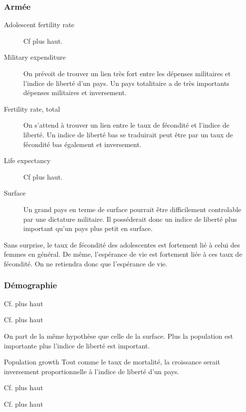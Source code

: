\subsubsection{Armée}
\begin{description}
\item [Adolescent fertility rate]
Cf plus haut.
\item [Military expenditure]
On prévoit de trouver un lien très fort entre les dépenses militaires et l'indice de liberté d'un pays. Un pays totalitaire a de très importants dépenses militaires et inversement.
\item [Fertility rate, total]
On s'attend à trouver un lien entre le taux de fécondité et l'indice de liberté. Un indice de liberté bas se traduirait peut être par un taux de fécondité bas également et inversement.
\item [Life expectancy]
Cf plus haut.
\item [Surface]
Un grand pays en terme de surface pourrait être difficilement controlable par une dictature militaire. Il posséderait donc un indice de liberté plus important qu'un pays plus petit en surface.
\end{description}

Sans surprise, le taux de fécondité des adolescentes est fortement lié à celui des femmes en général. De même, l'espérance de vie est fortement liée à ces taux de fécondité. On ne retiendra donc que l'espérance de vie.

\subsubsection{Démographie} 
\begin{description}
\item [Fertility rate]
Cf. plus haut
\item [Adolescent fertility]
Cf. plus haut
\item [Population totale]
On part de la même hypothèse que celle de la surface. Plus la population est importante plus l'indice de liberté est important.
\item Population growth
Tout comme le taux de mortalité, la croissance serait inversement proportionnelle à l'indice de liberté d'un pays.
\item [Life expectancy]
Cf. plus haut
\item [Surface]
Cf. plus haut
\end{description}

